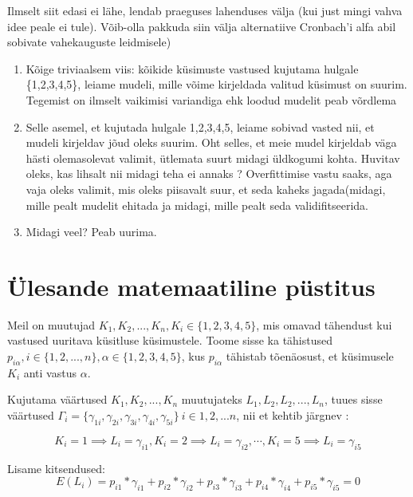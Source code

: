 \documentclass[a4paper]{article}
\begin{document}
{\color{cyan} Ilmselt siit edasi ei lähe, lendab praeguses lahenduses välja (kui just mingi vahva idee peale ei tule). Võib-olla pakkuda siin välja alternatiive Cronbach'i alfa abil sobivate vahekauguste leidmisele) }
\begin{enumerate}
\item Kõige triviaalsem viis: kõikide k\"usimuste vastused kujutama hulgale \{1,2,3,4,5\}, leiame mudeli, mille võime kirjeldada valitud k\"usimust on suurim. Tegemist on ilmselt vaikimisi variandiga ehk loodud mudelit peab võrdlema 
\item Selle asemel, et kujutada hulgale {1,2,3,4,5}, leiame sobivad vasted nii, et mudeli kirjeldav jõud oleks suurim. Oht selles, et meie mudel kirjeldab väga hästi olemasolevat valimit, \"utlemata suurt midagi \"uldkogumi kohta. {\color{blue} Huvitav oleks, kas lihsalt nii midagi teha ei annaks ? Overfittimise vastu saaks, aga vaja oleks valimit, mis oleks piisavalt suur, et seda kaheks jagada(midagi, mille pealt mudelit ehitada ja midagi, mille pealt seda validifitseerida}. 
\item {\color{blue} Midagi veel? Peab uurima.}
\end{enumerate}

\section*{\"Ulesande matemaatiline p\"ustitus}


Meil on muutujad $K_1,K_2,...,K_n, K_i \in \{1,2,3,4,5\}$, mis omavad tähendust kui vastused uuritava k\"usitluse k\"usimustele. Toome sisse ka tähistused $p_{i \alpha}, i \in \{1,2,...,n\}, \alpha \in \{1,2,3,4,5\}$, kus $p_{i \alpha}$ tähistab tõenäosust, et k\"usimusele $K_i$ anti vastus $\alpha$. 

Kujutama väärtused $K_1,K_2,...,K_n$ muutujateks  $L_1, L_2,L_2,...,L_n$, tuues sisse väärtused $\Gamma_i = \{\gamma_{1i},\gamma_{2i},\gamma_{3i},\gamma_{4i},\gamma_{5i}\} ~ i \in {1,2,...n}$, nii et kehtib järgnev : 

\begin{equation*}
K_i = 1 \implies L_i = \gamma_{i1}, K_i = 2 \implies L_i = \gamma_{i2},\cdots, K_i = 5 \implies L_i =\gamma_{i5}
\end{equation*}


Lisame kitsendused:
\begin{equation}
E(L_i) = p_{i1}*\gamma_{i1}+p_{i2}*\gamma_{i2}+p_{i3}*\gamma_{i3}+
p_{i4}*\gamma_{i4}+p_{i5}*\gamma_{i5}=0
\end{equation}
\end{document}
